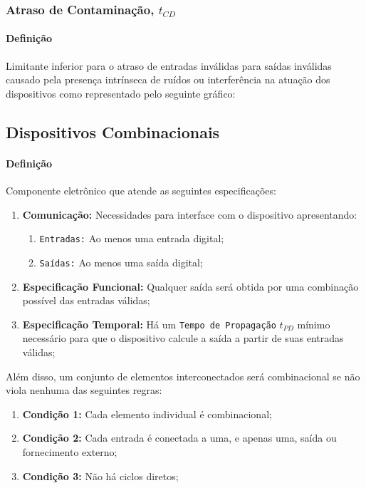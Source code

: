 \documentclass{article}
\begin{document}
        \subsubsection{Atraso de Contaminação, $t_{CD}$}
            \paragraph{Definição}Limitante inferior para o atraso de entradas inválidas para saídas inválidas causado pela presença intrínseca de ruídos ou interferência na atuação dos dispositivos como representado pelo seguinte gráfico:

        \subsection{Dispositivos Combinacionais}
            \paragraph{Definição}Componente eletrônico que atende as seguintes especificações:
                \begin{enumerate}[rightmargin = \leftmargin]
                    \item \textbf{Comunicação:} Necessidades para interface com o dispositivo apresentando:
                        \begin{enumerate}[noitemsep]
                            \item \texttt{Entradas:} Ao menos uma entrada digital;
                            \item \texttt{Saídas:} Ao menos uma saída digital;
                        \end{enumerate}

                    \item \textbf{Especificação Funcional:} Qualquer saída será obtida por uma combinação possível das entradas válidas;

                    \item \textbf{Especificação Temporal:} Há um \texttt{Tempo de Propagação} $t_{PD}$ mínimo necessário para que o dispositivo calcule a saída a partir de suas entradas válidas;
                \end{enumerate}
            Além disso, um conjunto de elementos interconectados será combinacional se não viola nenhuma das seguintes regras:
                \begin{enumerate}[noitemsep]
                    \item \textbf{Condição 1:} Cada elemento individual é combinacional;

                    \item \textbf{Condição 2:} Cada entrada é conectada a uma, e apenas uma, saída ou fornecimento externo;

                    \item \textbf{Condição 3:} Não há ciclos diretos;
                \end{enumerate}
\end{document}
